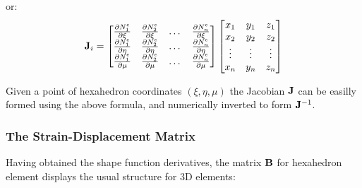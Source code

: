 or:
\begin{equation}
    \mathbf{J}_i =
    \begin{bmatrix}
        \frac{\partial N_1^e}{\partial \xi} &
        \frac{\partial N_2^e}{\partial \xi} &
        \dots &
        \frac{\partial N_n^e}{\partial \xi}\\
        \frac{\partial N_1^e}{\partial \eta} &
        \frac{\partial N_2^e}{\partial \eta} &
        \dots &
        \frac{\partial N_n^e}{\partial \eta}\\
        \frac{\partial N_1^e}{\partial \mu} &
        \frac{\partial N_2^e}{\partial \mu} &
        \dots &
        \frac{\partial N_n^e}{\partial \mu}
    \end{bmatrix}
    \begin{bmatrix}
        x_1 & y_1 & z_1 \\
        x_2 & y_2 & z_2 \\
        \vdots & \vdots & \vdots \\
        x_n & y_n & z_n
    \end{bmatrix}
\end{equation}


Given a point of hexahedron coordinates $ ( \xi, \eta, \mu ) $ the Jacobian $ \mathbf{J} $
can be easilly formed using the above formula, and numerically inverted to form
$ \mathbf{J}^{-1} $.


\subsubsection{The Strain-Displacement Matrix}

Having obtained the shape function derivatives, the matrix $ \mathbf{B} $ for hexahedron
element displays the usual structure for 3D elements:

